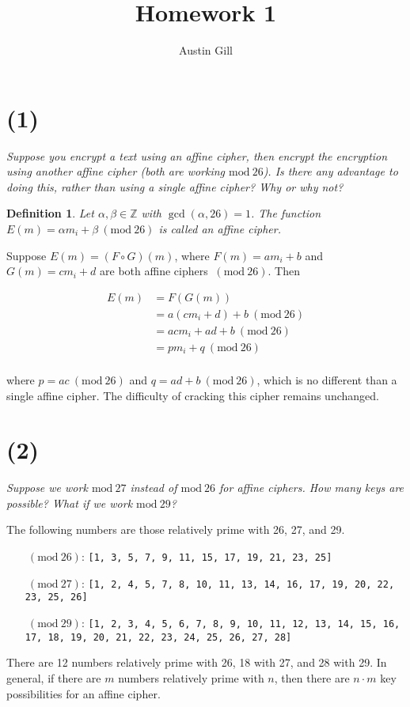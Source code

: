 \documentclass[12pt]{article}
\title{Homework 1}
\author{Austin Gill}
\renewcommand{\mod}[1]{\mathrm{mod}\ #1}
\renewcommand{\pmod}[1]{\ (\mod{#1})}
\newtheorem*{defn}{Definition}
\begin{document}
\maketitle

\section*{(1)} \textit{Suppose you encrypt a text using an affine cipher, then encrypt the encryption using another affine cipher (both are working $\mod{26}$). Is there any advantage to doing this, rather than using a single affine cipher? Why or why not?}

\begin{defn}
Let $\alpha , \beta \in \mathbb Z$ with $\gcd(\alpha , 26) = 1$. The function $E(m) = \alpha m_i + \beta \pmod{26}$ is called an affine cipher.
\end{defn}

Suppose $E(m) = (F \circ G)(m)$, where $F(m) = am_i + b$ and $G(m) = cm_i + d$ are both affine ciphers $\pmod{26}$. Then

\begin{align*}
    E(m) &= F(G(m))\\
         &= a(cm_i + d) + b \pmod{26}\\
         &= acm_i + ad + b \pmod{26}\\
         &= pm_i + q \pmod{26}\\
\end{align*}

where $p = ac \pmod{26}$ and $q = ad + b \pmod{26}$, which is no different than a single affine cipher. The difficulty of cracking this cipher remains unchanged.

\section*{(2)} \textit{Suppose we work $\mod{27}$ instead of $\mod{26}$ for affine ciphers. How many keys are possible? What if we work $\mod{29}$?}

The following numbers are those relatively prime with 26, 27, and 29.
\begin{itemize}
  \item[$\pmod{26}$:]
  \texttt{[1, 3, 5, 7, 9, 11, 15, 17, 19, 21, 23, 25]}
  \item[$\pmod{27}$:]
  \texttt{[1, 2, 4, 5, 7, 8, 10, 11, 13, 14, 16, 17, 19, 20, 22, 23, 25, 26]}
  \item[$\pmod{29}$:]
  \texttt{[1, 2, 3, 4, 5, 6, 7, 8, 9, 10, 11, 12, 13, 14, 15, 16, 17, 18, 19, 20, 21, 22, 23, 24, 25, 26, 27, 28]}
\end{itemize}
There are 12 numbers relatively prime with 26, 18 with 27, and 28 with 29. In general, if there are $m$ numbers relatively prime with $n$, then there are $n\cdot m$ key possibilities for an affine cipher.
\end{document}
